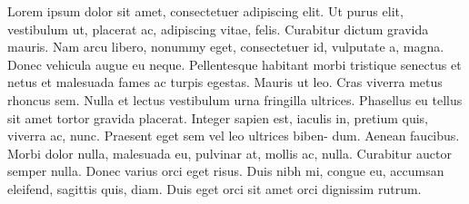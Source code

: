 Lorem ipsum dolor sit amet, consectetuer adipiscing elit. Ut purus elit, vestibulum ut, 
placerat ac, adipiscing vitae, felis. Curabitur dictum gravida mauris. Nam arcu libero, 
nonummy eget, consectetuer id, vulputate a, magna. Donec vehicula augue eu neque. 
Pellentesque habitant morbi tristique senectus et netus et malesuada fames ac turpis 
egestas. Mauris ut leo. Cras viverra metus rhoncus sem. Nulla et lectus vestibulum urna 
fringilla ultrices. Phasellus eu tellus sit amet tortor gravida placerat. Integer sapien 
est, iaculis in, pretium quis, viverra ac, nunc. Praesent eget sem vel leo ultrices 
biben- dum. Aenean faucibus. Morbi dolor nulla, malesuada eu, pulvinar at, mollis ac, 
nulla. Curabitur auctor semper nulla. Donec varius orci eget risus. Duis nibh mi, 
congue eu, accumsan eleifend, sagittis quis, diam. Duis eget orci sit amet orci 
dignissim rutrum.